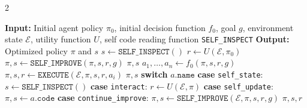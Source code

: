 \begin{algorithm*}[t!]
\small
\caption{Recursive Self-Improvement of \framework}
\vspace{-12pt}
\label{alg:1}
\begin{multicols}{2}
\begin{algorithmic}[1]
\State \textbf{Input:} Initial agent policy $\pi_0$, initial decision function $f_0$, goal $g$, environment state $\mathcal{E}$, utility function $U$, self code reading function \texttt{SELF\_INSPECT}
\State \textbf{Output:} Optimized policy $\pi$ and \framework $s$
\State {}
\State $s \gets \texttt{SELF\_INSPECT}()$
\State {}
\State $r \gets U(\mathcal{E}, \pi_0)$
\State {}
\State $\pi, s \gets \texttt{SELF\_IMPROVE}(\pi, s, r, g)$
\State \Return $\pi, s$
\State {}
    \State {}
    \State $a_1, \ldots, a_n \gets f_0(\pi, s, r, g)$
        \State $\pi, s, r \gets \texttt{EXECUTE}(\mathcal{E}, \pi, s, r, a_i)$
    \EndFor
    \State \Return $\pi, s$
\EndFunction
\State {}
    \State \textbf{switch} $a.\texttt{name}$
    \State \quad \textbf{case} \texttt{self\_state}:
    \State \quad\quad $s \gets \texttt{SELF\_INSPECT}()$
    \State \quad \textbf{case} \texttt{interact}:
    \State \quad\quad $r \gets U(\mathcal{E}, \pi)$ 
    \State \quad \textbf{case} \texttt{self\_update}:
    \State \quad\quad $\pi, s \gets a.\texttt{code}$ 
    \State \quad \textbf{case} \texttt{continue\_improve}:
    \State \quad\quad {}
    \State \quad\quad $\pi, s \gets \texttt{SELF\_IMPROVE}(\mathcal{E}, \pi, s, r, g)$ 
    \State \Return $\pi, s, r$
\EndFunction
\vspace{-10pt}
\end{algorithmic}
\end{multicols}
\end{algorithm*}





